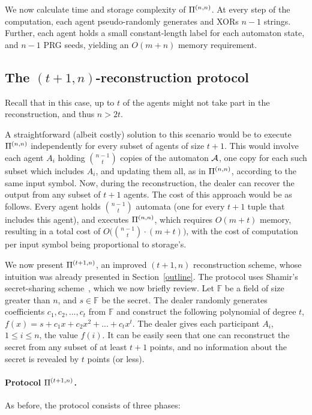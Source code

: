 \documentclass[letterpaper,11pt]{article}
\newcommand{\nnPi}{{\rm {\Pi}}^{(n,n)}}
\newcommand{\tnPi}{{\rm {\Pi}}^{(t+1,n)}}
\begin{document}
We now calculate time and storage complexity of $\nnPi$.
At every step of the
computation, each agent pseudo-randomly generates and XORs $n-1$ strings.
Further, each agent holds a small constant-length label for each
automaton state, and $n-1$ PRG seeds, yielding an
$O(m+n)$
memory requirement.



\subsection{The $(t+1,n)$-reconstruction protocol}
\label{sec-from-t}
Recall that in this case, up to $t$ of the agents might not take part
in the reconstruction, and thus $n>2t$.


A straightforward (albeit costly) solution to this scenario would be to execute $\nnPi$ independently for every subset of agents of size $t+1$.  This would involve each agent $A_i$ holding ${n-1 \choose t}$ copies of the automaton ${\cal A}$, one copy for each such subset which includes $A_i$, and updating them all, as in $\nnPi$, according to the same input symbol.  
Now, during the reconstruction, the dealer can recover the
output from any subset of $t+1$ agents. The cost of this approach would be as follows.  Every agent holds ${n-1 \choose t}$ automata (one for every $t+1$ tuple that includes this agent), and executes $\nnPi$, which requires $O(m+t)$ memory, resulting in a total cost of $O \big( {n-1\choose t}\cdot (m+t) \big)$,
with the cost of computation per input symbol being proportional to storage's.
 

We now present $\tnPi$, an improved $(t+1,n)$ reconstruction scheme,
whose intuition was already presented in Section~\ref{outline}. The protocol
uses Shamir's secret-sharing scheme~\cite{Sha79}, which we now 
briefly review. Let $\mathbb{F}$ be a field of
size greater than $n$,
and $s\in \mathbb{F}$ be the secret.
The dealer randomly generates coefficients $c_1,c_2,...,c_t$ from
$\mathbb{F}$ and construct the following polynomial of degree $t$,
$f(x)=s+c_1x+c_2x^2+...+c_{t}x^{t}$. 
The dealer gives each participant $A_i$, $1 \leq i \leq n$, the value $f(i)$.  It can be easily seen that one can reconstruct the
secret from any subset of at least $t+1$ points, and no information
about the secret is revealed by 
$t$ points (or less).

\vspace{-.15in}
\paragraph{Protocol $\tnPi$.} As before, the protocol consists of
three phases:
\end{document}
